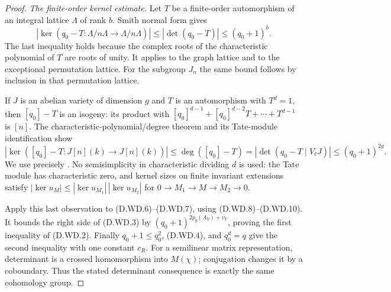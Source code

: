\begin{proof}
\emph{The finite-order kernel estimate.}
Let $T$ be a finite-order automorphism of an integral
lattice $\Lambda$ of rank $b$. Smith normal form gives
\[
 |\ker(q_0-T:\Lambda/n\Lambda\to\Lambda/n\Lambda)|
 \le|\det(q_0-T)|\le(q_0+1)^b.                         \tag{D.WD.9}
\]
The last inequality holds because the complex roots of
the characteristic polynomial of $T$ are roots of unity.
It applies to the graph lattice and to the exceptional
permutation lattice. For the subgroup $J_n$ the same
bound follows by inclusion in that permutation lattice.

If $J$ is an abelian variety of dimension $g$ and $T$
is an automorphism with $T^d=1$, then $[q_0]-T$ is an
isogeny: its product with
$[q_0]^{d-1}+[q_0]^{d-2}T+\cdots+T^{d-1}$ is $[n]$.
The characteristic-polynomial/degree theorem and its
Tate-module identification show
\[
 |\ker([q_0]-T:J[n](k)\to J[n](k))|
 \le\deg([q_0]-T)
 =\left|\det(q_0-T\mid V_\ell J)\right|
 \le(q_0+1)^{2g}.                                      \tag{D.WD.10}
\]
We use precisely
\citet[Theorem 10.9 and Proposition 10.20, with the written
proofs through Lemmas 10.21--10.22, pp.~46--52]{Milne2008AVScalarB}.
No semisimplicity in characteristic dividing $d$ is used:
the Tate module has characteristic zero, and kernel sizes
on finite invariant extensions satisfy
$|\ker u_M|\le|\ker u_{M_1}|\,|\ker u_{M_2}|$ for
$0\to M_1\to M\to M_2\to0$.

Apply this last observation to (D.WD.6)--(D.WD.7), using
(D.WD.8)--(D.WD.10). It bounds the right side of (D.WD.3)
by $(q_0+1)^{2p_g(A_V)+v_V}$, proving the first inequality
of (D.WD.2). Finally $q_0+1\le q_0^2$, (D.WD.4), and
$q_0^d=q$ give the second inequality with one constant
$c_R$. For a semilinear matrix representation, determinant
is a crossed homomorphism into $M(\chi)$; conjugation
changes it by a coboundary. Thus the stated determinant
consequence is exactly the same cohomology group.
\end{proof}
